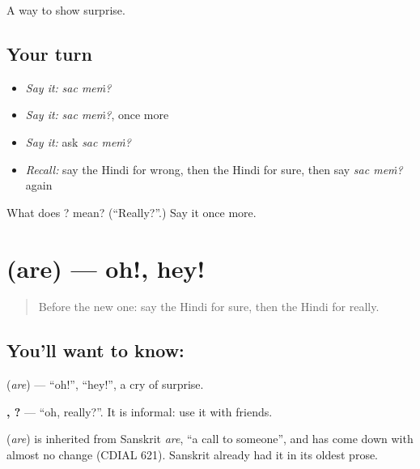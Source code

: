 \begin{grammarlens}[title={What you've built}]
A way to show surprise.
\end{grammarlens}

\subsection*{Your turn}
\begin{itemize}
\raggedright
  \item \emph{Say it:} \emph{sac meṁ?}
  \item \emph{Say it:} \emph{sac meṁ?}, once more
  \item \emph{Say it:} ask \emph{sac meṁ?}
  \item \emph{Recall:} say the Hindi for wrong, then the Hindi for sure, then say \emph{sac meṁ?} again
\end{itemize}

\begin{tcolorbox}[breakable,colback=teal!4,colframe=teal!35!black,title={Before you move on}]
What does  ? mean? (\textquotedblleft{}Really?\textquotedblright{}.) Say it once more.
\end{tcolorbox}
\section[\texorpdfstring{\hi{अरे} (are)}{अरे (are)}]{ (are) — oh!, hey!}

\label{lesson:HI-C112-are}



\begin{quote}
Before the new one: say the Hindi for sure, then the Hindi for really.
\end{quote}

\subsection*{You'll want to know: }
\textbf{} (\emph{are}) — \textquotedblleft{}oh!\textquotedblright{}, \textquotedblleft{}hey!\textquotedblright{}, a cry of surprise.

\textbf{,  ?} — \textquotedblleft{}oh, really?\textquotedblright{}. It is informal: use it with friends.

\begin{cousinweb}
\textbf{} (\emph{are}) is inherited from Sanskrit \emph{are}, \textquotedblleft{}a call to someone\textquotedblright{}, and has come down with almost no change (CDIAL 621). Sanskrit already had it in its oldest prose.
\end{cousinweb}

